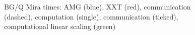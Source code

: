 \documentclass{sig-alternate}
\begin{document}
\begin{figure}
{  }
  \caption{BG/Q Mira times: AMG ({\color{blue}blue}), XXT ({\color{red}red}), communication (dashed),
  computation (single), communication (ticked), computational linear scaling
  ({\color{green}green})}
  \label{fig:scaling_mira}
\end{figure}
\end{document}
